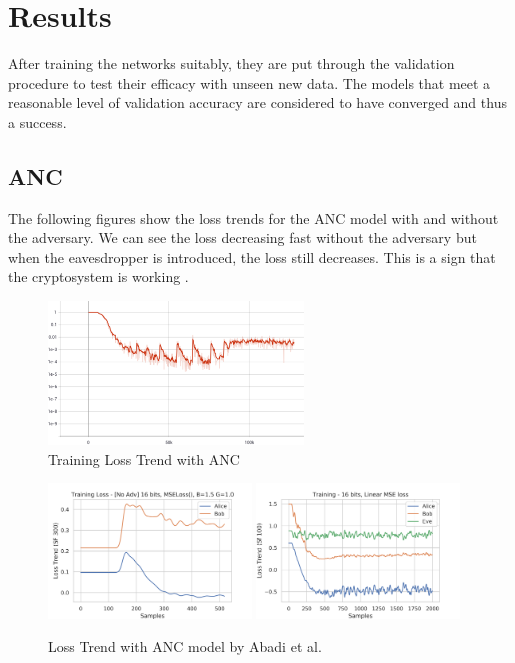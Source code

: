 \documentclass[a4paper]{article}
\begin{document}
  \section{Results}
  After training the networks suitably, they are put through the validation procedure to test their
  efficacy with unseen new data. The models that meet a reasonable level of validation accuracy are
  considered to have converged and thus a success.

  \subsection{ANC}
  The following figures show the loss trends for the ANC model with and without the adversary.
  We can see the loss decreasing fast without the adversary but when the eavesdropper is introduced,
  the loss still decreases. This is a sign that the cryptosystem is working \cite{perfanc}.

  \begin{figure}[H]
    \centering
    \includegraphics[height=1.5in]{../../models/anc/graphs/Loss_Training.png}
    \caption{Training Loss Trend with ANC}
    \label{fig:trn_crnet}
  \end{figure}

  \begin{figure}[H]
    \centering
    \includegraphics[width=0.48\textwidth]{../../models/cryptonet/graphs/loss_1E64x256v17.png}
    \includegraphics[width=0.48\textwidth]{../../models/anc/graphs/loss_1E2000v6.png}
    \caption{Loss Trend with ANC model by Abadi et al.}
    \label{fig:res_anc}
  \end{figure}
\end{document}
